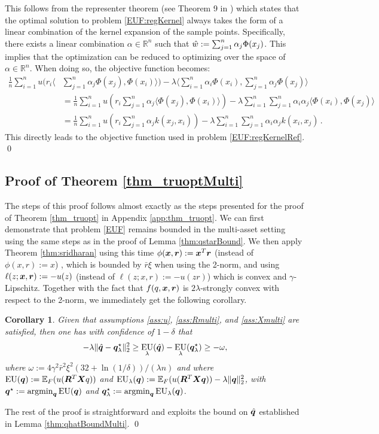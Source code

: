 \documentclass[]{interact}
\theoremstyle{plain}%
\newtheorem{corollary}[theorem]{Corollary}
\theoremstyle{definition}
\theoremstyle{remark}
\def\Expect{{\mathbb E}}
\def\argmin{\mathop{\rm argmin}}
\newcommand{\0}{\V{0}}
\newcommand{\1}{\V{1}}
\renewcommand{\Re}{\mathbb{R}}
\newcommand{\Halmos}{{\qed}}
\newcommand{\modified}[1]{{\color{blue} #1}}
\def\EU{\mathop{\rm EU}}
\theoremstyle{plain}
\theoremstyle{definition}
\begin{document}
This follows from the representer theorem (see Theorem 9 in \cite{kernel2008}) which states that the optimal solution to problem \eqref{EUF:regKernel} always takes the form of a linear combination of the kernel expansion of the sample points. Specifically,  there exists a linear combination $\alpha \in \Re^n$ such that ${\hat{w}}:=\sum_{j=1}^n \alpha_j \Phi(x_j)$. This implies that the optimization can be reduced to optimizing over the space of $\alpha\in\Re^n$. When doing so, the objective function becomes:
\begin{align*}
\frac{1}{n}\sum_{i=1}^n u(r_i \langle &\sum_{j=1}^n \alpha_j \Phi(x_j), \Phi(x_i)\rangle) - \lambda \langle \sum_{i=1}^n \alpha_i \Phi(x_i), \sum_{j=1}^n \alpha_j \Phi(x_j)\rangle \\
&= \frac{1}{n}\sum_{i=1}^n u(r_i \sum_{j=1}^n \alpha_j \langle \Phi(x_j), \Phi(x_i)\rangle) - \lambda \sum_{i=1}^n \sum_{j=1}^n \alpha_i  \alpha_j \langle \Phi(x_i), \Phi(x_j)\rangle\\
&= \frac{1}{n}\sum_{i=1}^n u(r_i \sum_{j=1}^n \alpha_j k(x_j,x_i)) - \lambda \sum_{i=1}^n \sum_{j=1}^n \alpha_i  \alpha_j k(x_i,x_j)\,.
\end{align*}
This directly leads to the objective function used in problem \eqref{EUF:regKernelRef}. \Halmos


\subsection{\modified{Proof of Theorem \ref{thm_truoptMulti}}}

The steps of this proof follows almost exactly as the steps presented for the proof of Theorem \ref{thm_truopt} in Appendix \ref{app:thm_truopt}. We can first demonstrate that problem \eqref{EUF} remains bounded in the multi-asset setting using the same steps as in the proof of Lemma \ref{thm:qstarBound}. We then apply Theorem \ref{thm:sridharan} using this time $\phi({\boldsymbol{x}},{\boldsymbol{r}}):={\boldsymbol{x}}^T{\boldsymbol{r}}$ (instead of $\phi(x,r):=x$) , which is bounded by $\bar{r}\xi$ when using the 2-norm, and using $\ell(z;{\boldsymbol{x}},{\boldsymbol{r}}):=-u(z)$ (instead of $\ell(z;x,r):=-u(zr)$) which is convex and $\gamma$-Lipschitz. Together with the fact that $f(q,{\boldsymbol{x}},{\boldsymbol{r}})$ is $2\lambda$-strongly convex with respect to the 2-norm, we immediately get the following corollary. 
 
\begin{corollary}\label{thm:shaiMulti}
  Given that assumptions \ref{ass:u}, \ref{ass:Rmulti}, and \ref{ass:Xmulti} are satisfied, then one has with confidence of
  $1-\delta$ that
  \[
    -\lambda\|\vqhat - \vq^\star_\lambda\|_2^2 \geq \EU_\lambda(\vqhat) - \EU_\lambda(\vq^\star_\lambda) \geq -\omega,
  \]
  where $\omega := 4\gamma^2\bar{r}^2 \xi^2(32+\ln(1/\delta))/(\lambda n)$ and where $\EU(\vq) := \Expect_F(u(\vR^T \vX q))$ and $\EU_\lambda(\vq) := \Expect_F(u(\vR^T \vX \vq)) - \lambda\|\vq\|_2^2$,
with $\vq^\star := \argmin_\vq \EU(\vq)$ and $\vq^\star_\lambda := \argmin_\vq \EU_\lambda(\vq)$.
\end{corollary}
The rest of the proof is straightforward and exploits the bound on ${\hat{\boldsymbol{q}}}$ established in Lemma \ref{thm:qhatBoundMulti}. \Halmos
\end{document}
